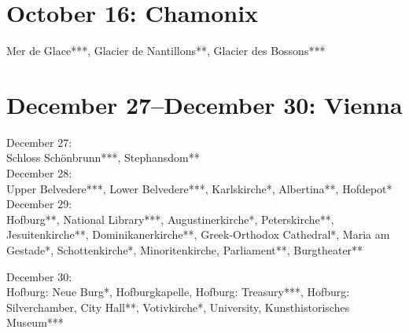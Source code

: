 \section{October 16: Chamonix}
\label{Chamonix2011}

Mer de Glace***, Glacier de Nantillons**, Glacier des Bossons***

\section{December 27--December 30: Vienna}
\label{Vienna2011}

December 27:\\
Schloss Sch\"onbrunn***, Stephansdom**\\

December 28:\\
Upper Belvedere***, Lower Belvedere***, Karlskirche*, Albertina**, Hofdepot*\\

December 29:\\
Hofburg**, National Library***, Augustinerkirche*, Peterskirche**, Jesuitenkirche**, Dominikanerkirche**, Greek-Orthodox Cathedral*, Maria am Gestade*, Schottenkirche*, Minoritenkirche, Parliament**, Burgtheater**

December 30:\\
Hofburg: Neue Burg*, Hofburgkapelle, Hofburg: Treasury***, Hofburg: Silverchamber, City Hall**, Votivkirche*, University, Kunsthistorisches Museum***